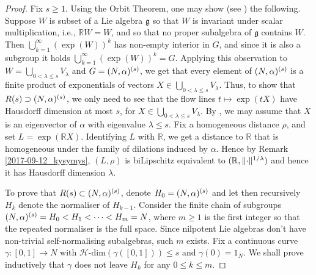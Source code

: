\documentclass[a4paper,12pt]{amsart}
\newcommand{\Hdim}{\mathcal{H}\text{-}\mathrm{dim}} %
\DeclarePairedDelimiter\norm{\lVert}{\rVert}
\theoremstyle{plain}
\theoremstyle{definition}
\theoremstyle{plain}
\theoremstyle{remark}
\begin{document}
\begin{proof}
	Fix \( s \ge 1 \). Using the Orbit Theorem, one may show (see \cite[Proposition~2.26]{bellettini}) the following. Suppose \( W \) is subset of a Lie algebra \( \mathfrak{g} \) so that \( W \) is invariant under scalar multiplication, i.e., \( \mathbb{R} W = W \), and so that no proper subalgebra of \( \mathfrak{g} \) contains \( W \). Then \( \bigcup_{k=1}^\infty (\exp(W))^k \) has non-empty interior in \( G \), and since it is also a subgroup it holds \( \bigcup_{k=1}^\infty (\exp(W))^k = G \). Applying this observation to \( W= \bigcup_{0 < \lambda \le s } V_\lambda \) and \( G = (N,\alpha)^{(s)} \), we get that every element of \( (N,\alpha)^{(s)} \) is a finite product of exponentials of vectors \( X \in \bigcup_{0 < \lambda \le s } V_\lambda \). Thus, to show  that \( R(s) \supset (N,\alpha)^{(s)} \), we only need to see that the flow lines \( t \mapsto \exp(tX) \)  have Hausdorff dimension at most \(s\), for \( X \in \bigcup_{0 < \lambda \le s } V_\lambda \). By \cite[Lemma 5.1]{avain:CPS}, we may assume that \( X \) is an eigenvector of \( \alpha \) with eigenvalue \( \lambda \le s \). Fix a homogeneous distance \( \rho \),
	and set \( L = \exp(\mathbb{R} X) \).
	Identifying  \( L \) with \( \mathbb{R} \), we get a distance to \( \mathbb{R} \) that is homogeneous under the family of dilations induced by \( \alpha \). Hence by Remark \ref{2017-09-12_kysymys},
	\( (L,\rho) \) is biLipschitz equivalent to \( (\mathbb{R},\norm{\cdot}^{1/\lambda}) \) and hence it has Hausdorff dimension \( \lambda \).
	 

	
	To prove that \( R(s) \subset (N,\alpha)^{(s)} \), denote 
	\( H_0 = (N,\alpha)^{(s)} \) and let then recursively  \( H_k \) denote the normaliser of \( H_{k-1} \).
	Consider the finite chain of subgroups \( (N,\alpha)^{(s)} = H_0 < H_1 < \cdots < H_m = N \), where \( m \ge 1 \) is the first integer so that the repeated normaliser is the full space. Since nilpotent Lie algebras don't have non-trivial self-normalising subalgebras, such \( m\) exists.
Fix a continuous curve \( \gamma \colon [0,1] \to N \) with \( \Hdim(\gamma([0,1])) \le s \) and \( \gamma(0) = 1_N \). We shall prove inductively that \( \gamma \) does not leave \( H_k \) for any \( 0 \le k \le m \).
	

\end{proof}
\end{document}

